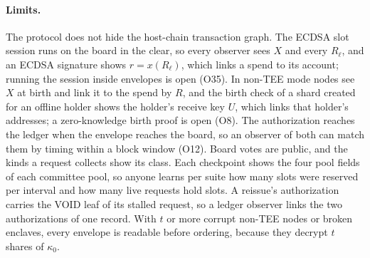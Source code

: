 \paragraph{Limits.} The protocol does not hide the host-chain transaction graph. The ECDSA slot session runs on the board in the clear, so every observer sees $X$ and every $R_\ell$, and an ECDSA signature shows $r = x(R_\ell)$, which links a spend to its account; running the session inside envelopes is open (O35). In non-TEE mode nodes see $X$ at birth and link it to the spend by $R$, and the birth check of a shard created for an offline holder shows the holder's receive key $U$, which links that holder's addresses; a zero-knowledge birth proof is open (O8). The authorization reaches the ledger when the envelope reaches the board, so an observer of both can match them by timing within a block window (O12). Board votes are public, and the kinds a request collects show its class. Each checkpoint shows the four pool fields of each committee pool, so anyone learns per suite how many slots were reserved per interval and how many live requests hold slots. A reissue's authorization carries the VOID leaf of its stalled request, so a ledger observer links the two authorizations of one record. With $t$ or more corrupt non-TEE nodes or broken enclaves, every envelope is readable before ordering, because they decrypt $t$ shares of $\kappa_0$.
